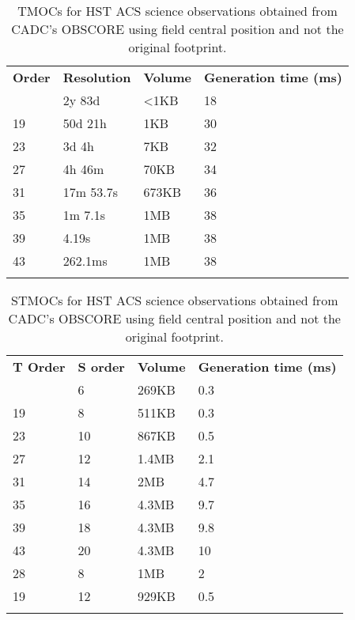 \begin{table}[!htbp]
\begin{center}
{\scriptsize
\begin{tabular}{p{}p{}p{}p{}}
\sptablerule
\textbf{Order} & \textbf{Resolution} & \textbf{Volume} & \textbf{Generation \newline time (ms)}\\
\sptablerule
15&	2y 83d&	<1KB&	18 \\
19&	50d 21h	&1KB&	30 \\
23&	3d 4h&	7KB&	32 \\
27&	4h 46m&	70KB&	34 \\
31&	17m 53.7s&	673KB&	36 \\
35&	1m 7.1s&	1MB&	38 \\
39&	4.19s&	1MB&	38 \\
43&	262.1ms&	1MB&	38 \\
\sptablerule
\end{tabular}
\caption[TMOC performances]{TMOCs for HST ACS science observations obtained from CADC's OBSCORE using field central position and not the original footprint.}
\normalsize
}
\label{table:tmocsizeacs}
\end{center}
\end{table}


\begin{table}[!htbp]
\begin{center}
{\scriptsize
\begin{tabular}{p{}p{}p{}p{}}
\sptablerule
\textbf{T Order} & \textbf{S order} & \textbf{Volume} & \textbf{Generation \newline time (ms)}\\
\sptablerule
15&	6&	269KB&	0.3\\
19&	8&	511KB&	0.3\\
23&	10&	867KB&	0.5\\
27&	12&	1.4MB&	2.1\\
31&	14&	2MB&	4.7\\
35&	16&	4.3MB&	9.7\\
39&	18&	4.3MB&	9.8\\
43&	20&	4.3MB&	10\\
28&	8&	1MB&	2\\
19&	12&	929KB&	0.5\\
\sptablerule
\end{tabular}
\caption[STMOC performances]{STMOCs for HST ACS science observations obtained from CADC's OBSCORE using field central position and not the original footprint.}
\normalsize
}
\label{table:tmocsizeacs}
\end{center}
\end{table}

